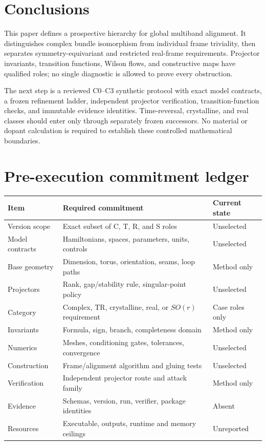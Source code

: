\documentclass[11pt]{article}
\begin{document}
\section{Conclusions}
This paper defines a prospective hierarchy for global multiband alignment. It
distinguishes complex bundle isomorphism from individual frame triviality, then separates
symmetry-equivariant and restricted real-frame requirements. Projector invariants,
transition functions, Wilson flows, and constructive maps have qualified roles; no
single diagnostic is allowed to prove every obstruction.

The next step is a reviewed C0--C3 synthetic protocol with exact model contracts, a
frozen refinement ladder, independent projector verification, transition-function
checks, and immutable evidence identities. Time-reversal, crystalline, and real classes
should enter only through separately frozen successors. No material or dopant calculation
is required to establish these controlled mathematical boundaries.

\appendix
\section{Pre-execution commitment ledger}
\begin{center}\small
\begin{tabularx}{\textwidth}{p{}YY}
\toprule
\textbf{Item} & \textbf{Required commitment} & \textbf{Current state} \\
\midrule
Version scope & Exact subset of C, T, R, and S roles & Unselected \\
Model contracts & Hamiltonians, spaces, parameters, units, controls & Unselected \\
Base geometry & Dimension, torus, orientation, seams, loop paths & Method only \\
Projectors & Rank, gap/stability rule, singular-point policy & Unselected \\
Category & Complex, TR, crystalline, real, or $SO(r)$ requirement & Case roles only \\
Invariants & Formula, sign, branch, completeness domain & Method only \\
Numerics & Meshes, conditioning gates, tolerances, convergence & Unselected \\
Construction & Frame/alignment algorithm and gluing tests & Unselected \\
Verification & Independent projector route and attack family & Method only \\
Evidence & Schemas, version, run, verifier, package identities & Absent \\
Resources & Executable, outputs, runtime and memory ceilings & Unreported \\
\bottomrule
\end{tabularx}
\end{center}
\end{document}
